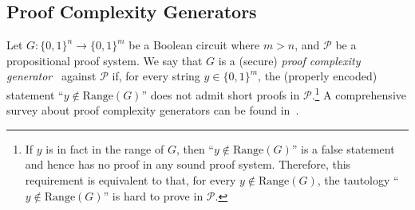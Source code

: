\documentclass[10pt,a4paper]{article}
\theoremstyle{definition}
\theoremstyle{remark}
\newcommand{\calP}{\mathcal{P}}
\newcommand{\Range}{\mathrm{Range}}
\begin{document}
\subsection{Proof Complexity Generators}

Let $G: \{0, 1\}^n \to \{0, 1\}^m$ be a Boolean circuit where $m > n$, and $\calP$ be a propositional proof system. We say that $G$ is a (secure) \emph{proof complexity generator}~\cite{ABRW04, krajivcek2001weak} against $\calP$ if, for every string $y \in \{0, 1\}^m$, the (properly encoded) statement ``$y \not\in \Range(G)$'' does not admit short proofs in $\calP$.\footnote{If $y$ is in fact in the range of $G$, then ``$y\not\in\Range(G)$'' is a false statement and hence has no proof in any sound proof system. Therefore, this requirement is equivalent to that, for every $y\not\in\Range(G)$, the tautology ``$y\not\in\Range(G)$'' is hard to prove in $\calP$.} A comprehensive survey about proof complexity generators can be found in~\cite{Krajicek-generator-book}.
\end{document}
